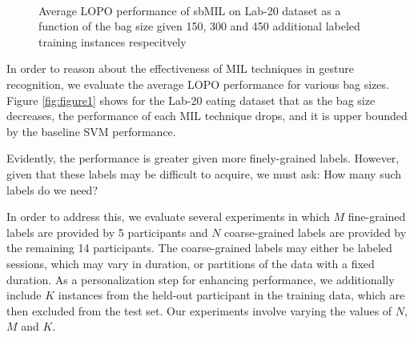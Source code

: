 \documentclass{sigchi}
\begin{document}
\begin{figure}
  \centering
  \qquad
  \qquad
  \caption{Average LOPO performance of sbMIL on Lab-20 dataset as a function of the bag size given 150, 300 and 450 additional labeled training instances respecitvely }~\label{fig:figure2}
\end{figure}

In order to reason about the effectiveness of MIL techniques in gesture recognition, we evaluate the average LOPO performance for various bag sizes. Figure \ref{fig:figure1} shows for the Lab-20 eating dataset that as the bag size decreases, the performance of each MIL technique drops, and it is upper bounded by the baseline SVM performance.

Evidently, the performance is greater given more finely-grained labels. However, given that these labels may be difficult to acquire, we must ask: How many such labels do we need?

In order to address this, we evaluate several experiments in which $M$ fine-grained labels are provided by 5 participants and $N$ coarse-grained labels are provided by the remaining 14 participants. The coarse-grained labels may either be labeled sessions, which may vary in duration, or partitions of the data with a fixed duration. As a personalization step for enhancing performance, we additionally include $K$ instances from the held-out participant in the training data, which are then excluded from the test set. Our experiments involve varying the values of $N$, $M$ and $K$.
\end{document}
